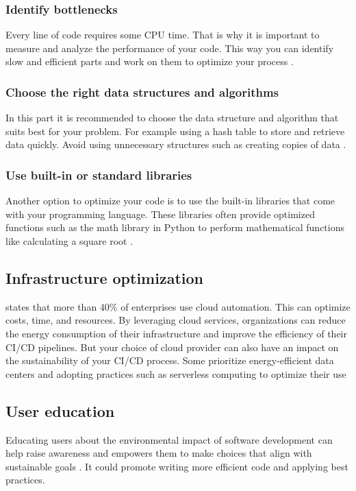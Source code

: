 \subsubsection{Identify bottlenecks}
Every line of code requires some CPU time. That is why it is important to measure and analyze the performance of your code. This way you can identify slow and efficient parts and work on them to optimize your process \autocite{Ojeda}.

\subsubsection{Choose the right data structures and algorithms}
In this part it is recommended to choose the data structure and algorithm that suits best for your problem. For example using a hash table to store and retrieve data quickly. Avoid using unnecessary structures such as creating copies of data \autocite{Ojeda}.

\subsubsection{Use built-in or standard libraries}
Another option to optimize your code is to use the built-in libraries that come with your programming language. These libraries often provide optimized functions such as the math library in Python to perform mathematical functions like calculating a square root \autocite{Ojeda}.


\subsection{Infrastructure optimization} 
\textcite{Krivec2023} states that more than 40\% of enterprises use cloud automation. This can optimize costs, time, and resources. By leveraging cloud services, organizations can reduce the energy consumption of their infrastructure and improve the efficiency of their CI/CD pipelines.
But your choice of cloud provider can also have an impact on the sustainability of your CI/CD process. Some prioritize energy-efficient data centers and adopting practices such as serverless computing to optimize their use \autocite{Festus2024}


\subsection{User education}
Educating users about the environmental impact of software development can help raise awareness and empowers them to make choices that align with sustainable goals \autocite{Festus2024}. 
It could promote writing more efficient code and applying best practices.


